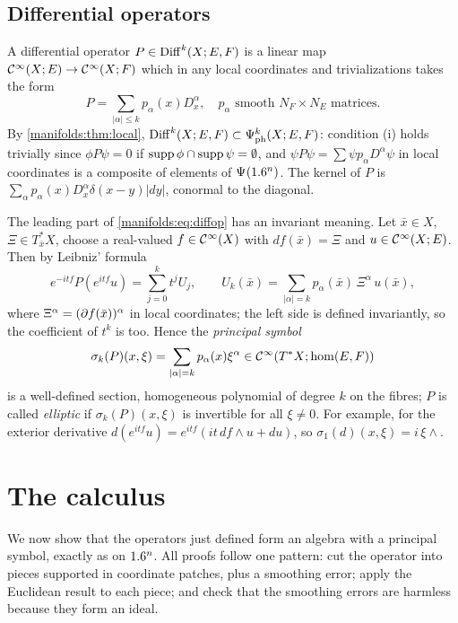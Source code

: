 \subsection{Differential operators}
A differential operator $P\in\operatorname{Diff}^{k}(X;E,F)$ is a linear map
$\mathcal{C}^\infty(X;E)\to\mathcal{C}^\infty(X;F)$ which in any local coordinates and trivializations takes the
form
\begin{equation}\label{manifolds:eq:diffop}
P=\sum_{|\alpha|\le k}p_\alpha(x)D_x^\alpha,\quad p_\alpha \text{ smooth }
N_F\times N_E \text{ matrices}.
\end{equation}
By \cref{manifolds:thm:local}, $\operatorname{Diff}^{k}(X;E,F)\subset\Psi^{k}_{\mathrm{ph}}(X;E,F)$:
condition (i) holds trivially since $\phi P\psi=0$ if $\operatorname{supp}\phi\cap\operatorname{supp}\psi=\emptyset$,
and $\psi P\psi=\sum\psi p_\alpha D^\alpha\psi$ in local coordinates is a composite of
elements of $\Psi^{}(1.6^n)$. The kernel of $P$ is
$\sum_\alpha p_\alpha(x)D^\alpha_x\delta(x-y)|dy|$, conormal to the diagonal.

The leading part of \eqref{manifolds:eq:diffop} has an invariant meaning. Let
$\bar x\in X$, $\Xi\in T^*_{\bar x}X$, choose a real-valued $f\in\mathcal{C}^\infty(X)$ with
$df(\bar x)=\Xi$ and $u\in\mathcal{C}^\infty(X;E)$. Then by Leibniz' formula
\begin{equation}\label{manifolds:eq:oscillatory-test}
e^{-itf}P(e^{itf}u)=\sum_{j=0}^kt^jU_j,\qquad
U_k(\bar x)=\sum_{|\alpha|=k}p_\alpha(\bar x)\,\Xi^\alpha\,u(\bar x),
\end{equation}
where $\Xi^\alpha=(\partial f(\bar x))^\alpha$ in local coordinates; the left side is
defined invariantly, so the coefficient of $t^k$ is too. Hence the
\emph{principal symbol}
\begin{equation*}
\sigma_k(P)(x,\xi)=\sum_{|\alpha|=k}p_\alpha(x)\xi^\alpha\in\mathcal{C}^\infty(T^*X;\hom(E,F))
\end{equation*}
is a well-defined section, homogeneous polynomial of degree $k$ on the fibres;
$P$ is called \emph{elliptic} if $\sigma_k(P)(x,\xi)$ is invertible for all
$\xi\ne0$. For example, for the exterior derivative
$d(e^{itf}u)=e^{itf}(it\,df\wedge u+du)$, so $\sigma_1(d)(x,\xi)=i\,\xi\wedge$.

\section{The calculus}\label{manifolds:sec:calculus}
We now show that the operators just defined form an algebra with a principal
symbol, exactly as on $1.6^n$. All proofs follow one pattern: cut the
operator into pieces supported in coordinate patches, plus a smoothing error;
apply the Euclidean result to each piece; and check that the smoothing errors
are harmless because they form an ideal.

